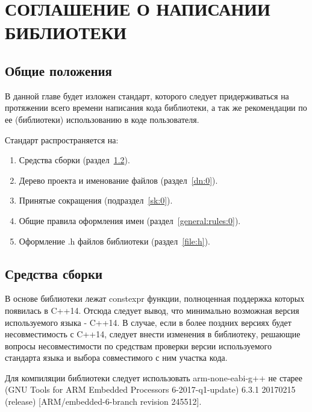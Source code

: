 \chapter{СОГЛАШЕНИЕ О НАПИСАНИИ БИБЛИОТЕКИ}
\section{Общие положения}
В данной главе будет изложен стандарт, которого следует придерживаться на протяжении всего времени написания кода библиотеки, а так же рекомендации по ее (библиотеки) использованию в коде пользователя.

Стандарт распространяется на:
\begin{enumerate}
	\item Средства сборки (раздел~\ref{compgcc:0}).
	\item Дерево проекта и именование файлов (раздел~\ref{dn:0}).
	\item Принятые сокращения (подраздел~\ref{sk:0}).
	\item Общие правила оформления имен (раздел~\ref{general:rules:0}).
	\item Оформление .h файлов библиотеки (раздел~\ref{file:h}).
\end{enumerate}

\section{Средства сборки}
\label{compgcc:0}
В основе библиотеки лежат constexpr функции, полноценная поддержка которых появилась в C++14. Отсюда следует вывод, что минимально возможная версия используемого языка - C++14. В случае, если в более поздних версиях будет несовместимость с C++14, следует внести изменения в библиотеку, решающие вопросы несовместимости по средствам проверки версии используемого стандарта языка и выбора совместимого с ним участка кода.

Для компиляции библиотеки следует использовать arm-none-eabi-g++ не старее (GNU Tools for ARM Embedded Processors 6-2017-q1-update) 6.3.1 20170215 (release) [ARM/embedded-6-branch revision 245512].

